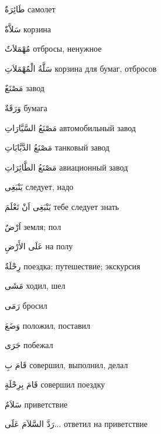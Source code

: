 \documentclass[a5paper]{article}
\newcommand\textstyleDropCaps[1]{#1}
\newcommand\textstyleCaptioncharacters[1]{#1}
\begin{document}
\textstyleCaptioncharacters{طَائِرَةٌ }\textstyleDropCaps{самолет‎}

\textstyleCaptioncharacters{سَلاَّةٌ }\textstyleDropCaps{корзина‎}

\textstyleCaptioncharacters{مُهْمَلاَتٌ }\textstyleDropCaps{отбросы, не­нужное‎}

\textstyleCaptioncharacters{سَلَّةُ الْمُهْمَلاَتِ }\textstyleDropCaps{корзи­на для бумаг, отбросов‎}

\textstyleCaptioncharacters{مَصْنَعٌ }\textstyleDropCaps{завод‎}

\textstyleCaptioncharacters{وَرَقَةٌ }\textstyleDropCaps{бумага‎}

\textstyleCaptioncharacters{مَصْنَعُ السَّيَّارَاتِ }\textstyleDropCaps{авто­мобильный завод‎}

\textstyleCaptioncharacters{مَصْنَعُ الدَّبَّابَاتِ }\textstyleDropCaps{тан­ковый завод‎}

\textstyleCaptioncharacters{مَصْنَعُ الطَّائِرَاتِ }\textstyleDropCaps{авиа­ционный завод‎}

\textstyleCaptioncharacters{يَنْبَغِى }\textstyleDropCaps{следует, надо‎}

\textstyleCaptioncharacters{يَنْبَغِى اَنْ تَعْلَمَ }\textstyleDropCaps{тебе следует знать‎}

\textstyleCaptioncharacters{اَرْضٌ }\textstyleDropCaps{земля; пол‎}

\textstyleCaptioncharacters{عَلَى الأَرْضِ }\textstyleDropCaps{на полу‎}

\textstyleCaptioncharacters{رِحْلَةٌ }\textstyleDropCaps{поездка; путеше­ствие; экскурсия‎}

\textstyleCaptioncharacters{مَشَى }\textstyleDropCaps{ходил, шел‎}

\textstyleCaptioncharacters{رَمَى }\textstyleDropCaps{бросил‎}

\textstyleCaptioncharacters{وَضَعَ }\textstyleDropCaps{положил, поставил‎}

\textstyleCaptioncharacters{جَرَى }\textstyleDropCaps{побежал‎}

\textstyleCaptioncharacters{قَامَ بِ }\textstyleDropCaps{совершил, выпол­нил, делал‎}

\textstyleCaptioncharacters{قَامَ بِرِحْلَةٍ }\textstyleDropCaps{совершил поездку‎}

\textstyleCaptioncharacters{سَلاَمٌ }\textstyleDropCaps{приветствие‎}

\textstyleCaptioncharacters{رَدَّ السَّلاَمَ عَلَى...ِ }\textstyleDropCaps{от­ветил на приветствие‎}
\end{document}
